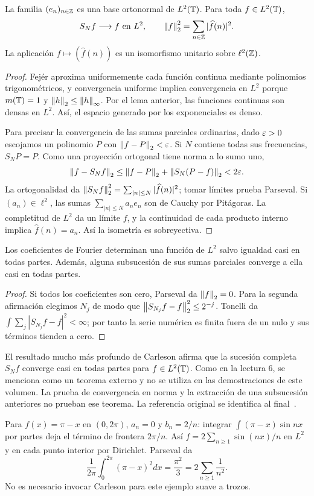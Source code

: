 \begin{teorema}\label{v4:base-fourier}
La familia $(e_n)_{n\in\mathbb Z}$ es una base ortonormal de $L^2(\mathbb T)$. Para toda $f\in L^2(\mathbb T)$,
\[
 S_Nf\longrightarrow f\text{ en }L^2,
 \qquad\left\lVert f\right\rVert_2^2=\sum_{n\in\mathbb Z}|\widehat f(n)|^2.
\]
La aplicación $f\mapsto(\widehat f(n))$ es un isomorfismo unitario sobre $\ell^2(\mathbb Z)$.
\end{teorema}
\begin{proof}
Fejér aproxima uniformemente cada función continua mediante polinomios trigonométricos, y convergencia uniforme implica convergencia en $L^2$ porque $m(\mathbb T)=1$ y $\left\lVert h\right\rVert_2\leq\left\lVert h\right\rVert_\infty$. Por el lema anterior, las funciones continuas son densas en $L^2$. Así, el espacio generado por los exponenciales es denso.

Para precisar la convergencia de las sumas parciales ordinarias, dado $\varepsilon>0$ escojamos un polinomio $P$ con $\left\lVert f-P\right\rVert_2<\varepsilon$. Si $N$ contiene todas sus frecuencias, $S_NP=P$. Como una proyección ortogonal tiene norma a lo sumo uno,
\[
 \left\lVert f-S_Nf\right\rVert_2\leq\left\lVert f-P\right\rVert_2+\left\lVert S_N(P-f)\right\rVert_2<2\varepsilon.
\]
La ortogonalidad da $\left\lVert S_Nf\right\rVert_2^2=\sum_{|n|\leq N}|\widehat f(n)|^2$; tomar límites prueba Parseval. Si $(a_n)\in\ell^2$, las sumas $\sum_{|n|\leq N}a_ne_n$ son de Cauchy por Pitágoras. La completitud de $L^2$ da un límite $f$, y la continuidad de cada producto interno implica $\widehat f(n)=a_n$. Así la isometría es sobreyectiva.
\end{proof}
\begin{corolario}
Los coeficientes de Fourier determinan una función de $L^2$ salvo igualdad casi en todas partes. Además, alguna subsucesión de sus sumas parciales converge a ella casi en todas partes.
\end{corolario}
\begin{proof}
Si todos los coeficientes son cero, Parseval da $\left\lVert f\right\rVert_2=0$. Para la segunda afirmación elegimos $N_j$ de modo que $\left\lVert S_{N_j}f-f\right\rVert_2^2\leq2^{-j}$. Tonelli da $\int\sum_j|S_{N_j}f-f|^2<\infty$; por tanto la serie numérica es finita fuera de un nulo y sus términos tienden a cero.
\end{proof}
\begin{observacion}
El resultado mucho más profundo de Carleson afirma que la sucesión completa $S_Nf$ converge casi en todas partes para $f\in L^2(\mathbb T)$. Como en la lectura 6, se menciona como un teorema externo y no se utiliza en las demostraciones de este volumen. La prueba de convergencia en norma y la extracción de una subsucesión anteriores no prueban ese teorema. La referencia original se identifica al final~\cite{carleson1966}.
\end{observacion}
\begin{ejemplo}
Para $f(x)=\pi-x$ en $(0,2\pi)$, $a_n=0$ y $b_n=2/n$: integrar $\int(\pi-x)\sin nx$ por partes deja el término de frontera $2\pi/n$. Así $f=2\sum_{n\geq1}\sin(nx)/n$ en $L^2$ y en cada punto interior por Dirichlet. Parseval da
\[
 \frac1{2\pi}\int_0^{2\pi}(\pi-x)^2dx=\frac{\pi^2}3
 =2\sum_{n\geq1}\frac1{n^2}.
\]
No es necesario invocar Carleson para este ejemplo suave a trozos.
\end{ejemplo}

